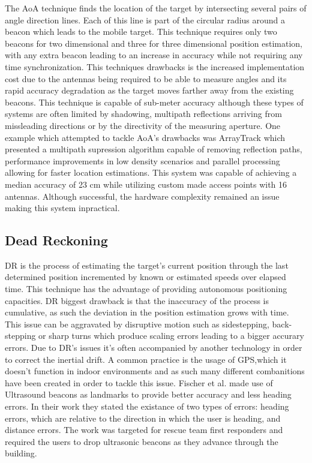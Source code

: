 The \ac{AoA} technique finds the location of the target by intersecting several pairs of angle direction lines. Each of this line is part of the circular radius around a beacon which leads to the mobile target. This technique requires only two beacons for two dimensional and three for three dimensional position estimation, with any extra beacon leading to an increase in accuracy while not requiring any time synchronization.
This techniques drawbacks is the increased implementation cost due to the antennas being required to be able to measure angles and its rapid accuracy degradation as the target moves farther away from the existing beacons. This technique is capable of sub-meter accuracy although these types of systems are often limited by shadowing, multipath reflections arriving from missleading directions or by the directivity of the measuring aperture. 
One example which attempted to tackle \ac{AoA}'s drawbacks was ArrayTrack \cite{arraytrack} which presented a multipath supression algorithm capable of removing reflection paths, performance improvements in low density scenarios and parallel processing allowing for faster location estimations. This system was capable of achieving a median accuracy of 23 cm while utilizing custom made access points with 16 antennas. Although successful, the hardware complexity remained an issue making this system inpractical.


\subsection{Dead Reckoning}
\label{subsec:dr}

\ac{DR} is the process of estimating the target's current position through the last determined position incremented by known or estimated speeds over elapsed time. This technique has the advantage of providing autonomous positioning capacities. \ac{DR} biggest drawback is that the inaccuracy of the process is cumulative, as such the deviation in the position estimation grows with time. This issue can be aggravated by disruptive motion such as sidestepping, back-stepping or sharp turns which produce scaling errors leading to a bigger accurary errors. Due to \ac{DR}'s issues it's often accompanied by another technology in order to correct the inertial drift. A common practice is the usage of GPS,which it doesn't function in indoor environments and as such many different combanitions have been created in order to tackle this issue. Fischer et al. \cite{dr1} made use of Ultrasound beacons as landmarks to provide better accuracy and less heading errors. In their work they stated the existance of two types of errors: heading errors, which are relative to the direction in which the user is heading, and distance errors. The work was targeted for rescue team first responders and required the users to drop ultrasonic beacons as they advance through the building.
